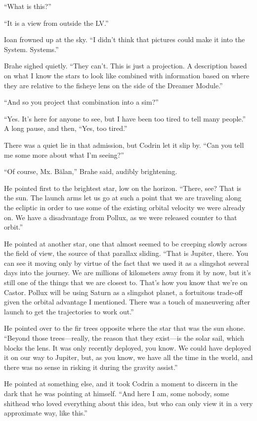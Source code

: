 ``What is this?''

``It is a view from outside the LV.''

Ioan frowned up at the sky. ``I didn't think that pictures could make it into the System. Systems.''

Brahe sighed quietly. ``They can't. This is just a projection. A description based on what I know the stars to look like combined with information based on where they are relative to the fisheye lens on the side of the Dreamer Module.''

``And so you project that combination into a sim?''

``Yes. It's here for anyone to see, but I have been too tired to tell many people.'' A long pause, and then, ``Yes, too tired.''

There was a quiet lie in that admission, but Codrin let it slip by. ``Can you tell me some more about what I'm seeing?''

``Of course, Mx. Bălan,'' Brahe said, audibly brightening.

He pointed first to the brightest star, low on the horizon. ``There, see? That is the sun. The launch arms let us go at such a point that we are traveling along the ecliptic in order to use some of the existing orbital velocity we were already on. We have a disadvantage from Pollux, as we were released counter to that orbit.''

He pointed at another star, one that almost seemed to be creeping slowly across the field of view, the source of that parallax sliding. ``That is Jupiter, there. You can see it moving only by virtue of the fact that we used it as a slingshot several days into the journey. We are millions of kilometers away from it by now, but it's still one of the things that we are closest to. That's how you know that we're on Castor. Pollux will be using Saturn as a slingshot planet, a fortuitous trade-off given the orbital advantage I mentioned. There was a touch of maneuvering after launch to get the trajectories to work out.''

He pointed over to the fir trees opposite where the star that was the sun shone. ``Beyond those trees---really, the reason that they exist---is the solar sail, which blocks the lens. It was only recently deployed, you know. We could have deployed it on our way to Jupiter, but, as you know, we have all the time in the world, and there was no sense in risking it during the gravity assist.''

He pointed at something else, and it took Codrin a moment to discern in the dark that he was pointing at himself. ``And here I am, some nobody, some shithead who loved everything about this idea, but who can only view it in a very approximate way, like this.''

